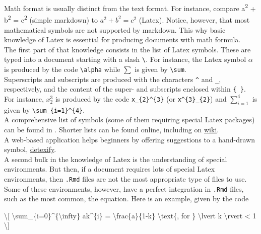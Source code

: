 \documentclass[]{book}
\newenvironment{Shaded}{}{}
\newcommand{\NormalTok}[1]{#1}
\theoremstyle{definition}
\theoremstyle{definition}
\theoremstyle{definition}
\theoremstyle{remark}
\begin{document}
Math format is usually distinct from the text format. For instance,
compare a\textsuperscript{2} + b\textsuperscript{2} =
c\textsuperscript{2} (simple markdown) to \(a^2 + b^2 = c^2\) (Latex).
Notice, however, that most mathematical symbols are not supported by
markdown. This why basic knowledge of Latex is essential for producing
documents with math formula.\\
The first part of that knowledge consists in the list of Latex symbols.
These are typed into a document starting with a slash
\texttt{\textbackslash{}}. For instance, the Latex symbol \(\alpha\) is
produced by the code \texttt{\textbackslash{}alpha} while \(\sum\) is
given by \texttt{\textbackslash{}sum}.\\
Superscripts and subscripts are produced with the characters
\texttt{\^{}} and \texttt{\_}, respectively, and the content of the
super- and subscripts enclosed within \texttt{\{\ \}}. For instance,
\(x_{2}^{3}\) is produced by the code \texttt{x\_\{2\}\^{}\{3\}} (or
\texttt{x\^{}\{3\}\_\{2\}}) and \(\sum_{i=1}^{4}\) is given by
\texttt{\textbackslash{}sum\_\{i=1\}\^{}\{4\}}.\\
A comprehensive list of symbols (some of them requiring special Latex
packages) can be found in \citet{latexlist}. Shorter lists can be found
online, including on
\href{https://oeis.org/wiki/List_of_LaTeX_mathematical_symbols}{wiki}.\\
A web-based application helps beginners by offering suggestions to a
hand-drawn symbol,
\href{http://detexify.kirelabs.org/classify.html}{detexify}.\\
A second bulk in the knowledge of Latex is the understanding of special
environments. But then, if a document requires lots of special Latex
environments, then \texttt{.Rmd} files are not the most appropriate type
of files to use.\\
Some of these environments, however, have a perfect integration in
\texttt{.Rmd} files, such as the most common, the equation. Here is an
example, given by the code

\begin{Shaded}
\begin{Highlighting}[]
 
\NormalTok{\textbackslash{}[}
\NormalTok{\textbackslash{}sum_\{i=0\}^\{\textbackslash{}infty\} ak^\{i\} = \textbackslash{}frac\{a\}\{1-k\} \textbackslash{}text\{, for \}  \textbackslash{}lvert k \textbackslash{}rvert < 1}
\NormalTok{\textbackslash{}]}
\end{Highlighting}
\end{Shaded}
\end{document}
